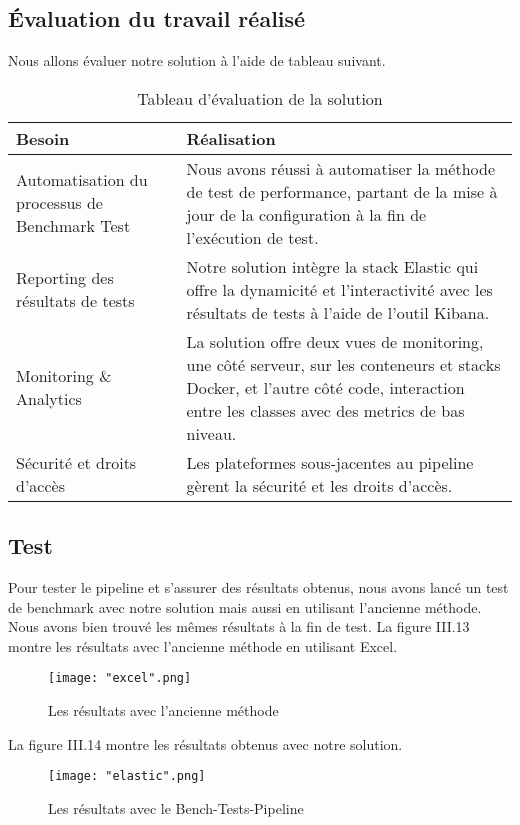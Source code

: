 \begin{spacing}{1.2}
\subsection{Évaluation du travail réalisé}
Nous allons évaluer notre solution à l'aide de tableau suivant. 
\begin{table}[ht]
	\centering
	\caption{Tableau d’évaluation de la solution}
	\footnotesize
	\begin{tabularx}{\textwidth}{|p{4.2cm}|X|}
          \hline 
          {\textbf{Besoin}} & \multicolumn{1}{T|}{{\textbf{Réalisation}}} \\
          \hline
           Automatisation du processus de Benchmark Test & Nous avons réussi à automatiser la méthode de test de performance, partant de la mise à jour de la configuration à la fin de l'exécution de test.\\
           \hline
           Reporting des résultats de tests & Notre solution intègre la stack Elastic qui offre la dynamicité et l'interactivité avec les résultats de tests à l'aide de l'outil Kibana.\\
           \hline
            Monitoring \& Analytics & La solution offre deux vues de monitoring, une côté serveur, sur les conteneurs et stacks Docker, et l'autre côté  code, interaction entre les classes avec des metrics de bas niveau.\\
          \hline
           Sécurité et droits d’accès & Les plateformes sous-jacentes au pipeline gèrent la sécurité et les droits d'accès.\\
           \hline
        \end{tabularx}
\end{table}
\subsection{Test}
Pour tester le pipeline et s'assurer des résultats obtenus, nous avons lancé un test de benchmark avec notre solution mais aussi en utilisant l'ancienne méthode. Nous avons bien trouvé les mêmes résultats à la fin de test. La figure III.13 montre les résultats avec l'ancienne méthode en utilisant Excel.
\begin{figure}[!ht]\centering
\texttt{[image: "excel".png]} 
\caption{Les résultats avec l'ancienne méthode}
\label{fig:fig13}
\end{figure}
\FloatBarrier
La figure III.14 montre les résultats obtenus avec notre solution. 
\begin{figure}[!ht]\centering
\texttt{[image: "elastic".png]} \caption{Les résultats avec le Bench-Tests-Pipeline}
\label{fig:fig14}
\end{figure}
\FloatBarrier

\end{spacing}
